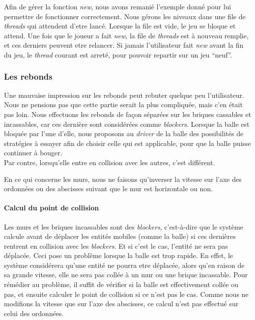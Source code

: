 \documentclass[a4paper,10pt]{article}
\begin{document}
        Afin de gérer la fonction \textit{new}, nous avons remanié l'exemple donné pour lui permettre de fonctionner
        correctement. Nous gérons les niveaux dans une file de \textit{threads} qui attendent d'etre lancé. Lorsque la file
        est vide, le jeu se bloque et attend. Une fois que le joueur a fait \textit{new}, la file de \textit{threads} est
        à nouveau remplie, et ces derniers peuvent etre relancer. Si jamais l'utilisateur fait \textit{new} avant
        la fin du jeu, le \textit{thread} courant est arreté, pour pouvoir repartir sur un jeu ``neuf''.

    \subsubsection{Les rebonds}
        Une mauvaise impression sur les rebonds peut rebuter quelque peu l'utilisateur. Nous ne pensions pas que
        cette partie serait la plus compliquée, mais c'en était pas loin. Nous effectuons les rebonds de façon
        séparées sur les briques cassables et incassables, car ces dernière sont considérées comme \textit{blockers}.
        Lorsque la balle est bloquée par l'une d'elle, nous proposons au \textit{driver} de la balle des possibilités
        de stratégies à essayer afin de choisir celle qui est applicable, pour que la balle puisse continuer à bouger. \\
        Par contre, lorsqu'elle entre en collision avec les autres, c'est différent.

        En ce qui concerne les murs, nous ne faisons qu'inverser la vitesse sur l'axe des ordonnées ou des abscisses suivant
        que le mur est horizontale ou non.

        \paragraph{Calcul du point de collision}
            Les murs et les briques incassables sont des \textit{blockers}, c'est-à-dire que le système calcule avant de
            déplacer les entités mobiles (comme la balle) si ces dernières rentrent en collision avec les \textit{blockers}.
            Et si c'est le cas, l'entité ne sera pas déplacée. Ceci pose un problème lorsque la balle est trop rapide. En
            effet, le système considérera qu'une entité ne pourra etre déplacée, alors qu'en raison de sa grande vitesse,
            elle ne sera pas collée à un mur ou une brique incassable. Pour rémédier au problème, il suffit de vérifier si
            la balle est effectivement collée ou pas, et ensuite calculer le point de collision si ce n'est pas le cas.
            Comme nous ne modifions la vitesse que sur l'axe des abscisses, ce calcul n'est pas effectué sur celui des
            ordonnées.
\end{document}
